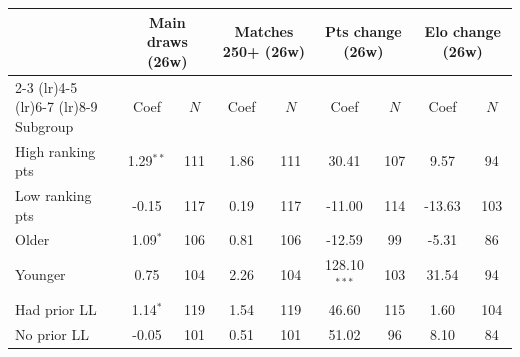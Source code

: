 \begin{tabular}{l cc cc cc cc}
\toprule
 & \multicolumn{2}{c}{Main draws (26w)} & \multicolumn{2}{c}{Matches 250+ (26w)} & \multicolumn{2}{c}{Pts change (26w)} & \multicolumn{2}{c}{Elo change (26w)} \\
\cmidrule(lr){2-3} \cmidrule(lr){4-5} \cmidrule(lr){6-7} \cmidrule(lr){8-9}
Subgroup & Coef & $N$ & Coef & $N$ & Coef & $N$ & Coef & $N$ \\
\midrule
High ranking pts & 1.29$^{**}$ & 111 & 1.86 & 111 & 30.41 & 107 & 9.57 & 94 \\
Low ranking pts & -0.15 & 117 & 0.19 & 117 & -11.00 & 114 & -13.63 & 103 \\
Older & 1.09$^{*}$ & 106 & 0.81 & 106 & -12.59 & 99 & -5.31 & 86 \\
Younger & 0.75 & 104 & 2.26 & 104 & 128.10$^{***}$ & 103 & 31.54 & 94 \\
Had prior LL & 1.14$^{*}$ & 119 & 1.54 & 119 & 46.60 & 115 & 1.60 & 104 \\
No prior LL & -0.05 & 101 & 0.51 & 101 & 51.02 & 96 & 8.10 & 84 \\
\bottomrule
\end{tabular}

